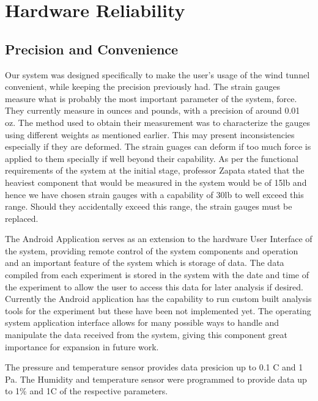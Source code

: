 \section{Hardware Reliability}

	\subsection{Precision and Convenience}

	Our system was designed specifically to make the user's usage of the wind tunnel convenient, while keeping the precision previously had. The strain gauges measure what is probably the most important parameter of the system, force. They currently measure in ounces and pounds, with a precision of around 0.01 oz. The method used to obtain their measurement was to characterize the gauges using different weights as mentioned earlier. This may present inconsistencies especially if they are deformed. The strain guages can deform if too much force is applied to them specially if well beyond their capability. As per the functional requirements of the system at the initial stage, professor Zapata stated that the heaviest component that would be measured in the system would be of 15lb and hence we have chosen strain gauges with a capability of 30lb to well exceed this range. Should they accidentally exceed this range, the strain gauges must be replaced.
	
	The Android Application serves as an extension to the hardware User Interface of the system, providing remote control of the system components and operation and an important feature of the system which is storage of data. The data compiled from each experiment is stored in the system with the date and time of the experiment to allow the user to access this data for later analysis if desired. Currently the Android application has the capability to run custom built analysis tools for the experiment but these have been not implemented yet. The operating system application interface allows for many possible ways to handle and manipulate the data received from the system, giving this component great importance for expansion in future work.

	The pressure and temperature sensor provides data presicion up to 0.1 C and 1 Pa. The Humidity and temperature sensor were programmed to provide data up to 1\% and 1C of the respective parameters.

